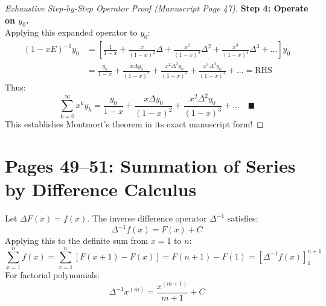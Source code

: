 \begin{proof}[Exhaustive Step-by-Step Operator Proof (Manuscript Page 47)]
\noindent\textbf{Step 4: Operate on $y_0$.} \\
Applying this expanded operator to $y_0$:
\begin{align}
    (1 - x E)^{-1} y_0 &= \left[ \frac{1}{1 - x} + \frac{x}{(1 - x)^2}\Delta + \frac{x^2}{(1 - x)^3}\Delta^2 + \frac{x^3}{(1 - x)^4}\Delta^3 + \dots \right] y_0 \nonumber \\
    &= \frac{y_0}{1 - x} + \frac{x \Delta y_0}{(1 - x)^2} + \frac{x^2 \Delta^2 y_0}{(1 - x)^3} + \frac{x^3 \Delta^3 y_0}{(1 - x)^4} + \dots = \text{RHS}
\end{align}
Thus:
\begin{equation}
    \boxed{\sum_{k=0}^\infty x^k y_k = \frac{y_0}{1 - x} + \frac{x \Delta y_0}{(1 - x)^2} + \frac{x^2 \Delta^2 y_0}{(1 - x)^3} + \dots} \quad \blacksquare
\end{equation}
This establishes Montmort's theorem in its exact manuscript form!
\end{proof}

\section{Pages 49--51: Summation of Series by Difference Calculus}
\label{sec:summation_series}

\begin{theorembox}
Let $\Delta F(x) = f(x)$. The inverse difference operator $\Delta^{-1}$ satisfies:
\begin{equation}
    \Delta^{-1} f(x) = F(x) + C
\end{equation}
Applying this to the definite sum from $x = 1$ to $n$:
\begin{equation}
    \sum_{x=1}^n f(x) = \sum_{x=1}^n [F(x+1) - F(x)] = F(n+1) - F(1) = \boxed{\left[ \Delta^{-1} f(x) \right]_1^{n+1}}
\end{equation}
For factorial polynomials:
\begin{equation}
    \boxed{\Delta^{-1} x^{(m)} = \frac{x^{(m+1)}}{m + 1} + C}
\end{equation}
\end{theorembox}

